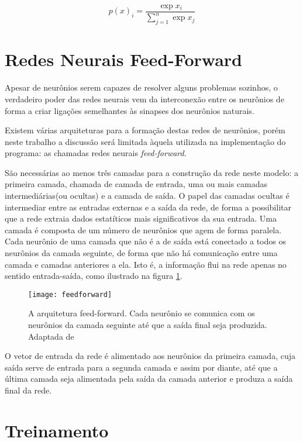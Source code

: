 \begin{equation}
p(x)_i = \frac{\exp{x_i}}{\sum_{j=1}^n\exp{x_j}}
\label{eq:softmax}
\end{equation}




\section{Redes Neurais Feed-Forward}

Apesar de neurônios serem capazes de resolver alguns problemas sozinhos, o verdadeiro poder das redes neurais vem da interconexão entre os neurônios de forma a criar ligações semelhantes às sinapses dos neurônios naturais.

Existem várias arquiteturas para a formação destas redes de neurônios, porém neste trabalho a discussão será limitada àquela utilizada na implementação do programa: as chamadas redes neurais \textit{feed-forward}.

São necessárias ao menos três camadas para a construção da rede neste modelo: a primeira camada, chamada de camada de entrada, uma ou mais camadas intermediárias(ou ocultas) e a camada de saída. O papel das camadas ocultas é intermediar entre as entradas externas e a saída da rede, de forma a possibilitar que a rede extraia dados estatíticos mais significativos da sua entrada.  Uma camada é composta de um número de neurônios que agem de forma paralela. Cada neurônio de uma camada que não é a de saída está conectado a todos os neurônios da camada seguinte, de forma que não há comunicação entre uma camada e camadas anteriores a ela. Isto é, a informação flui na rede apenas no sentido entrada-saída, como ilustrado na figura \ref{fig:feedfoward}.

\begin{figure}
\centering
\texttt{[image: feedforward]}
\label{fig:feedfoward}
\caption{A arquitetura feed-forward. Cada neurônio se comunica com os neurônios da camada seguinte até que a saída final seja produzida. Adaptada de \cite{Haykin}}
\end{figure}

O vetor de entrada da rede é alimentado aos neurônios da primeira camada, cuja saída serve de entrada para a segunda camada e assim por diante, até que a última camada seja alimentada pela saída da camada anterior e produza a saída final da rede. 

\section{Treinamento}


